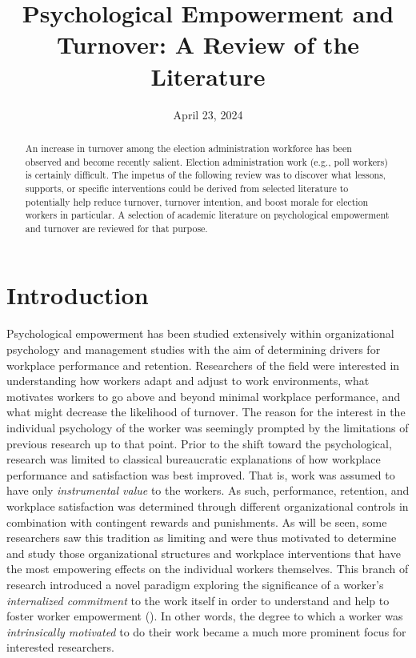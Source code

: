 \documentclass[
  11pt,
  a4paper,
]{article}
\title{Psychological Empowerment and Turnover: A Review of the
Literature}
\date{April 23, 2024}
\author{\sf{\Large\textbf{Isaiah Espinoza} \\\large Research
Assistant\\[0.5cm]}}
\makeatletter
\def\maketitle{\front{\expandafter{\@title}}{\@author}{\@organization}}
\makeatother
\begin{document}
\maketitle
\begin{abstract}
An increase in turnover among the election administration workforce has
been observed and become recently salient. Election administration work
(e.g., poll workers) is certainly difficult. The impetus of the
following review was to discover what lessons, supports, or specific
interventions could be derived from selected literature to potentially
help reduce turnover, turnover intention, and boost morale for election
workers in particular. A selection of academic literature on
psychological empowerment and turnover are reviewed for that purpose.
\end{abstract}

\section{Introduction}\label{introduction}

Psychological empowerment has been studied extensively within
organizational psychology and management studies with the aim of
determining drivers for workplace performance and retention. Researchers
of the field were interested in understanding how workers adapt and
adjust to work environments, what motivates workers to go above and
beyond minimal workplace performance, and what might decrease the
likelihood of turnover. The reason for the interest in the individual
psychology of the worker was seemingly prompted by the limitations of
previous research up to that point. Prior to the shift toward the
psychological, research was limited to classical bureaucratic
explanations of how workplace performance and satisfaction was best
improved. That is, work was assumed to have only \emph{instrumental
value} to the workers. As such, performance, retention, and workplace
satisfaction was determined through different organizational controls in
combination with contingent rewards and punishments. As will be seen,
some researchers saw this tradition as limiting and were thus motivated
to determine and study those organizational structures and workplace
interventions that have the most empowering effects on the individual
workers themselves. This branch of research introduced a novel paradigm
exploring the significance of a worker's \emph{internalized commitment}
to the work itself in order to understand and help to foster worker
empowerment (). In
other words, the degree to which a worker was \emph{intrinsically
motivated} to do their work became a much more prominent focus for
interested researchers.
\end{document}
